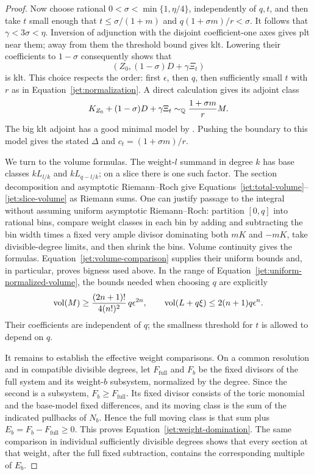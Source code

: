 \begin{proof}
Now choose rational \(0<\sigma<\min\{1,\eta/4\}\), independently of
\(q,t\), and then take \(t\) small enough that
\(t\le\sigma/(1+m)\) and \(q(1+\sigma m)/r<\sigma\).
It follows that \(\gamma<3\sigma<\eta\).
Inversion of adjunction with the disjoint coefficient-one axes
gives plt near them; away from them the threshold bound gives klt.
Lowering their coefficients to \(1-\sigma\) consequently shows that
\[
 (Z_0,(1-\sigma)D+\gamma\Xi_t)
\]
is klt.  This choice respects the order: first \(\epsilon\), then
\(q\), then sufficiently small \(t\) with \(r\) as in
Equation~\eqref{jet:normalization}.
A direct calculation gives its adjoint class
\[
 K_{Z_0}+(1-\sigma)D+\gamma\Xi_t
   \sim_{\mathbb{Q}}\frac{1+\sigma m}{r}M.
\]
The big klt adjoint has a good minimal model by
\cite{BCHM2010}.  Pushing the boundary to this model gives the stated
\(\Delta\) and \(c_t=(1+\sigma m)/r\).

We turn to the volume formulas.  The weight-\(l\) summand in degree
\(k\) has base classes \(kL_{l/k}\) and \(kL_{q-l/k}\); on a slice there is one
such factor.  The section decomposition and asymptotic Riemann--Roch
give Equations~\eqref{jet:total-volume}--\eqref{jet:slice-volume}
as Riemann sums.  One can justify passage to the integral without
assuming uniform asymptotic Riemann--Roch: partition \([0,q]\) into
rational bins, compare weight classes in each bin by adding and
subtracting the bin width times a fixed very ample divisor
dominating both \(mK\) and \(-mK\), take divisible-degree limits,
and then shrink the bins.  Volume continuity gives the formulas.
Equation~\eqref{jet:volume-comparison} supplies their uniform bounds
and, in particular, proves bigness used above.
In the range of Equation~\eqref{jet:uniform-normalized-volume},
the bounds needed when choosing \(q\) are explicitly
\[
 \operatorname{vol}(M)\ge \frac{(2n+1)!}{4(n!)^2}\,q\epsilon^{2n},
 \qquad
 \operatorname{vol}(L+q\xi)\le2(n+1)q\epsilon^n.
\]
Their coefficients are independent of \(q\); the smallness threshold
for \(t\) is allowed to depend on \(q\).

It remains to establish the effective weight comparisons. On a common
resolution and in compatible divisible degrees, let \(F_{\mathrm{full}}\)
and \(F_b\) be the fixed divisors of the full system and its
weight-\(b\) subsystem, normalized by the degree. Since the second is a
subsystem, \(F_b\ge F_{\mathrm{full}}\). Its fixed divisor consists of
the toric monomial and the base-model fixed differences, and its moving
class is the sum of the indicated pullbacks of \(N_b\). Hence the full
moving class is that sum plus
\(E_b=F_b-F_{\mathrm{full}}\ge0\). This proves
Equation~\eqref{jet:weight-domination}.  The same comparison in
individual sufficiently divisible degrees shows that every section
at that weight, after the full fixed subtraction, contains the
corresponding multiple of \(E_b\).


\end{proof}
